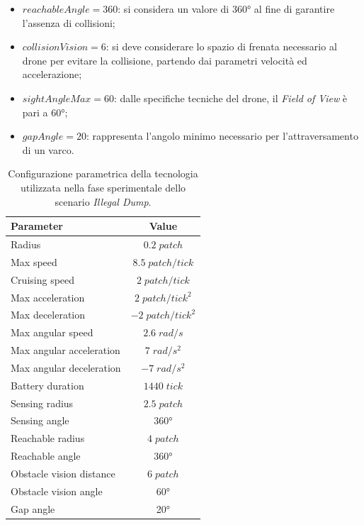 \begin{itemize}
    \item $reachableAngle = 360$: si considera un valore di \ang{360} al fine di garantire l'assenza di collisioni;
    \item $collisionVision = 6$: si deve considerare lo spazio di frenata necessario al drone per evitare la collisione, partendo dai parametri velocità ed accelerazione;
    \item $sightAngleMax = 60$: dalle specifiche tecniche del drone, il \textit{Field of View} è pari a \ang{60};
    \item $gapAngle = 20$: rappresenta l'angolo minimo necessario per l'attraversamento di un varco. 
\end{itemize}

\begin{table}[H]
    \centering
    \captionsetup{justification=centering, margin=2cm, font=footnotesize}
    \begin{tabular}{|l|c|}
    \hline
    \textbf{Parameter}              & \textbf{Value}                \\ \hline
    Radius                          & $0.2 \; patch$                \\ \hline
    Max speed                       & $8.5 \; patch/tick$           \\ \hline
    Cruising speed                  & $2 \; patch/tick$             \\ \hline
    Max acceleration                & $2 \; patch/tick^{2}$         \\ \hline
    Max deceleration                & $-2 \; patch/tick^{2}$        \\ \hline
    Max angular speed               & $2.6 \; rad/s$                \\ \hline
    Max angular acceleration        & $7 \; rad/s^{2}$              \\ \hline
    Max angular deceleration        & $-7 \; rad/s^{2}$             \\ \hline
    Battery duration                & $1440 \; tick$                \\ \hline
    Sensing radius                  & $2.5 \; patch$                \\ \hline
    Sensing angle                   & \ang{360}                        \\ \hline
    Reachable radius                & $4 \; patch$                  \\ \hline
    Reachable angle                 & \ang{360}                        \\ \hline
    Obstacle vision distance        & $6 \; patch$                  \\ \hline
    Obstacle vision angle           & \ang{60}                        \\ \hline
    Gap angle                       & \ang{20}                        \\ \hline
    \end{tabular}%
    
    \caption{Configurazione parametrica della tecnologia utilizzata nella fase sperimentale dello scenario \textit{Illegal Dump}.}
    \label{tabella_parametri_dump}
\end{table}

